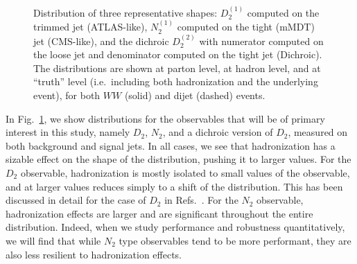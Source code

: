 \documentclass[11pt,letterpaper]{article}
\begin{document}
\begin{figure}
  \caption{Distribution of three representative shapes: $D_2^{(1)}$
    computed on the trimmed jet (ATLAS-like), $N_2^{(1)}$ computed on
    the tight (mMDT) jet (CMS-like), and the dichroic $D_2^{(2)}$ with numerator
    computed on the loose jet and denominator computed on the tight
    jet (Dichroic). The distributions are shown at parton level, at hadron level,
    and at ``truth'' level (i.e.\ including both hadronization and the
    underlying event), for both $WW$ (solid) and dijet (dashed)
    events.}\label{jetsub_2prong_fig:shape-distribution}
\end{figure}

In Fig.~\ref{jetsub_2prong_fig:shape-distribution}, we show distributions for the observables that will be of primary interest in this study, namely $D_2$, $N_2$, and a dichroic version of $D_2$, measured on both background and signal jets.
%
In all cases, we see that hadronization has a sizable effect on the shape of the distribution, pushing it to larger values.
%
For the $D_2$ observable, hadronization is mostly isolated to small values of the observable, and at larger values reduces simply to a shift of the distribution.
%
This has been discussed in detail for the case of $D_2$ in Refs.~\cite{Larkoski:2015kga,Larkoski:2017cqq,Larkoski:2017iuy}.
%
For the $N_2$ observable, hadronization effects are larger and are significant throughout the entire distribution.
%
Indeed, when we study performance and robustness quantitatively, we will find that while $N_2$ type observables tend to be more performant, they are also less resilient to hadronization effects. 
\end{document}
